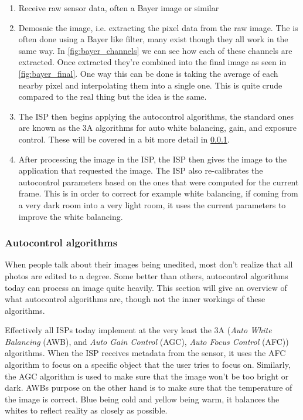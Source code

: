\begin{enumerate}
    \item Receive raw sensor data, often a Bayer image or similar

    \item Demosaic the image, i.e. extracting the pixel data from the raw
        image. The is often done using a Bayer like filter, many exist though
        they all work in the same way. In \cref{fig:bayer_channels} we can see
        how each of these channels are extracted. Once extracted they're
        combined into the final image as seen in \cref{fig:bayer_final}. One
        way this can be done is taking the average of each nearby pixel and
        interpolating them into a single one. This is quite crude compared to
        the real thing but the idea is the same.

    \item The ISP then begins applying the autocontrol algorithms, the standard
        ones are known as the 3A algorithms for auto white balancing, gain, and
        exposure control. These will be covered in a bit more detail in
        \cref{section:autocontrol}.

    \item After processing the image in the ISP, the ISP then gives the image
        to the application that requested the image. The ISP also re-calibrates
        the autocontrol parameters based on the ones that were computed for the
        current frame. This is in order to correct for example white balancing,
        if coming from a very dark room into a very light room, it uses the
        current parameters to improve the white balancing.


\end{enumerate}

\subsubsection{Autocontrol algorithms} \label{section:autocontrol}

When people talk about their images being unedited, most don't realize that all
photos are edited to a degree. Some better than others, autocontrol algorithms
today can process an image quite heavily. This section will give an overview of
what autocontrol algorithms are, though not the inner workings of these
algorithms.

Effectively all ISPs today implement at the very least the 3A (\textit{Auto
White Balancing} (AWB), and \textit{Auto Gain Control} (AGC), \textit{Auto
Focus Control} (AFC)) algorithms. When the ISP receives metadata from the sensor,
it uses the AFC algorithm to focus on a specific object that the user tries to
focus on. Similarly, the AGC algorithm is used to make sure that the image won't
be too bright or dark. AWBs purpose on the other hand is to make sure that the
temperature of the image is correct. Blue being cold and yellow being warm, it
balances the whites to reflect reality as closely as possible.

